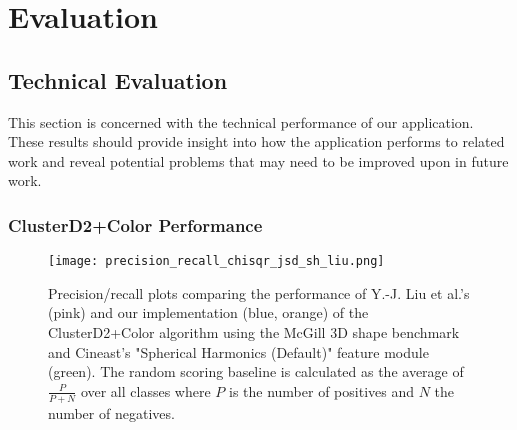 \chapter{Evaluation}

\section{Technical Evaluation}

This section is concerned with the technical performance of our application. These results should provide insight
into how the application performs to related work and reveal potential problems that may need to be improved upon
in future work.

\subsection{ClusterD2+Color Performance}

\begin{figure}
\centering
\captionsetup{width=0.8\textwidth}
\texttt{[image: precision\_recall\_chisqr\_jsd\_sh\_liu.png]}
\caption{Precision/recall plots comparing the performance of Y.-J. Liu et al.'s (pink) and our implementation (blue, orange) of the ClusterD2+Color algorithm using the McGill 3D shape benchmark \cite{mcgill_shape_benchmark} and Cineast's "Spherical Harmonics (Default)" feature module (green). The random scoring baseline is calculated as the average of $\frac{P}{P+N}$ over all classes where $P$ is the number of positives and $N$ the number of negatives.}
\label{fig:precision_recall}
\end{figure}

